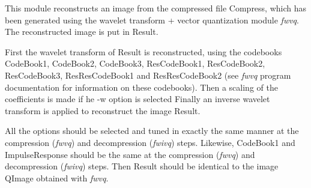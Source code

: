 This module reconstructs an image from the compressed file Compress, 
which has been generated using the wavelet transform + vector quantization 
module {\em fwvq}. 
The reconstructed image is put in Result. 

First the wavelet transform of Result is reconstructed, 
using the codebooks CodeBook1, CodeBook2, CodeBook3, ResCodeBook1, 
ResCodeBook2, ResCodeBook3, ResResCodeBook1 and ResResCodeBook2 
(see {\em fwvq} program documentation for information on these codebooks). 
Then a scaling of the coefficients is made if he -w option is selected
Finally an inverse wavelet transform is applied to reconstruct the image
Result. 

All the options should be selected and tuned in exactly the same 
manner at the compression ({\em fwvq}) and decompression ({\em fwivq}) steps. 
Likewise, CodeBook1 and ImpulseResponse should be the same 
at the compression ({\em fwvq}) and decompression ({\em fwivq}) steps. 
Then Result should be identical to the image QImage obtained with {\em fwvq}. 
